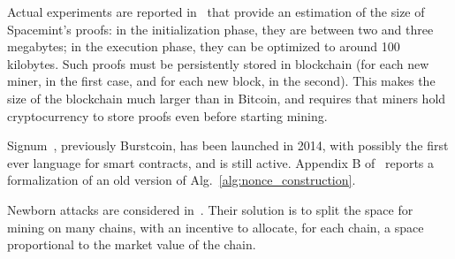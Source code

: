 Actual experiments are reported in~\cite{ParkKFGAP18}
that provide an estimation of the size of Spacemint's proofs:
in the initialization phase, they are between two and three megabytes;
in the execution phase, they can be optimized to around 100 kilobytes.
Such proofs must be persistently stored in
blockchain (for each new miner, in the first case, and for each new block, in the second).
This makes the size of the blockchain much larger than in Bitcoin, and requires
that miners hold cryptocurrency to store proofs even before starting mining.

Signum~\cite{Signum}, previously Burstcoin, has been launched in 2014, with possibly
the first ever language for smart contracts, and is still active.
Appendix B of~\cite{ParkKFGAP18} reports a formalization of an old version
of Alg.~\ref{alg:nonce_construction}.

Newborn attacks are considered in~\cite{TangZDWLG0L19}. Their solution is
to split the space for mining on many chains, with an
incentive to allocate, for each chain, a space proportional
to the market value of the chain.
